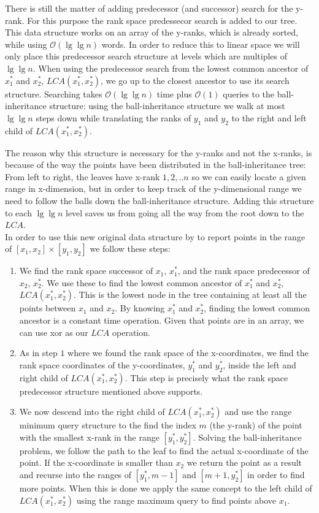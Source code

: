 There is still the matter of adding predecessor (and successor) search for the y-rank.
For this purpose the rank space predessecor search is added to our tree. This data structure works on an array of the y-ranks, which is already sorted, while using $\mathcal{O}(\lg \lg n)$ words. In order to reduce this to linear space we will only place this predecessor search structure at levels which are multiples of $\lg \lg n$. When using the predecessor search from the lowest common ancestor of $x^*_1$ and $x^*_2$, $LCA(x^*_1, x^*_2)$, we go up to the closest ancestor to use its search structure. Searching takes $\mathcal{O}(\lg \lg n)$ time plus $\mathcal{O}(1)$ queries to the ball-inheritance structure: using the ball-inheritance structure we walk at most $\lg \lg n$ steps down while translating the ranks of $y_1$ and $y_2$ to the right and left child of $LCA(x^*_1, x^*_2)$. 

The reason why this structure is necessary for the y-ranks and not the x-ranks, is because of the way the points have been distributed in the ball-inheritance tree: From left to right, the leaves have x-rank $1,2,..n$ so we can easily locate a given range in x-dimension, but in order to keep track of the y-dimensional range we need to follow the balls down the ball-inheritance structure. Adding this structure to each $\lg \lg n$ level saves us from going all the way from the root down to the $LCA$.  \\

In order to use this new original data structure by \citet{chanetal} to report points in the range of $[x_1, x_2] \times [y_1, y_2]$ we follow these steps:
\begin{enumerate}
  \item We find the rank space successor of $x_1$, $x^*_1$, and the rank space predecessor of $x_2$, $x^*_2$. We use these to find the lowest common ancestor of $x^*_1$ and $x^*_2$, $LCA(x^*_1, x^*_2)$. This is the lowest node in the tree containing at least all the points between $x_1$ and $x_2$. By knowing $x^*_1$ and $x^*_2$, finding the lowest common ancestor is a constant time operation. Given that points are in an array, we can use xor as our $LCA$ operation. 
  \item As in step $1$ where we found the rank space of the x-coordinates, we find the rank space coordinates of the y-coordinates, $y^*_1$ and $y^*_2$, inside the left and right child of $LCA(x^*_1, x^*_2)$. This step is precisely what the rank space predecessor structure mentioned above supports.
  \item We now descend into the right child of $LCA(x^*_1, x^*_2)$ and use the range minimum query structure to the find the index $m$ (the y-rank) of the point with the smallest x-rank in the range $[y^*_1, y^*_2]$. Solving the ball-inheritance problem, we follow the path to the leaf to find the actual x-coordinate of the point. If the x-coordinate is smaller than $x_2$ we return the point as a result and recurse into the ranges of $[y^*_1, m-1]$ and $[m+1, y^*_2]$ in order to find more points. When this is done we apply the same concept to the left child of $LCA(x^*_1, x^*_2)$ using the range maximum query to find points above $x_1$.
\end{enumerate}

